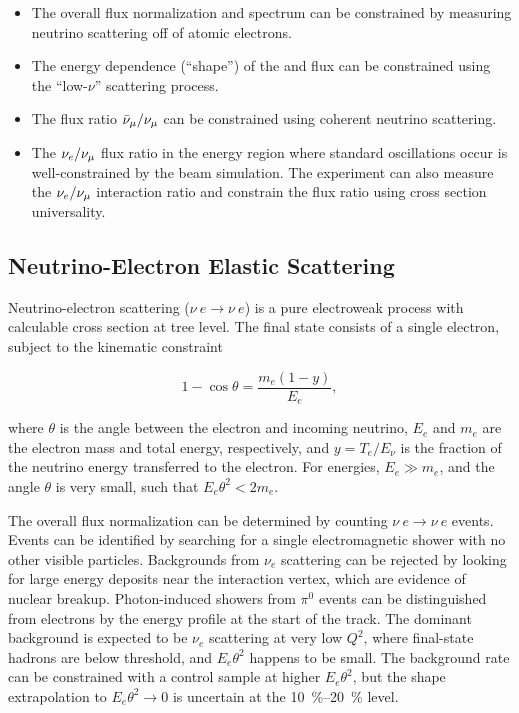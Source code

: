 \begin{itemize}
    \item The overall flux normalization and spectrum can be constrained by measuring neutrino scattering off of atomic electrons.
    \item The energy dependence (``shape'') of the \numu and \anumu %
     flux can be constrained using the ``low-$\nu$'' scattering process.
    \item The flux ratio $\bar\nu_\mu/\nu_\mu$ can be constrained using  coherent neutrino scattering.
    \item The $\nu_e/\nu_\mu$ flux ratio in the energy region where standard oscillations occur is well-constrained by the beam simulation. The experiment can also measure the $\nu_e/\nu_\mu$ interaction ratio and constrain the flux ratio using cross section universality.
\end{itemize}





\subsection{Neutrino-Electron Elastic Scattering}
\label{sec:appx-nd:fluxintro-e-nu-scatt}



Neutrino-electron scattering ($\nu \ e \rightarrow \nu \ e$) is a pure electroweak process with calculable cross section at tree level. The final state consists of a single electron, subject to the kinematic constraint 

\begin{equation}
1 - \cos \theta = \frac{m_{e}(1-y)}{E_{e}},
\end{equation}

where $\theta$ is the angle between the electron and incoming neutrino, $E_{e}$ and $m_{e}$ are the electron mass and total energy, respectively, and $y = T_{e}/E_{\nu}$ is the fraction of the neutrino energy transferred to the electron. For  energies, $E_{e} \gg m_{e}$, and the angle $\theta$ is very small, such that $E_{e}\theta^{2} < 2m_{e}$. 

The overall flux normalization can be determined by counting $\nu \ e \rightarrow \nu \ e$ events. Events can be identified by searching for a single electromagnetic shower with no other visible particles. Backgrounds from $\nu_{e}$  scattering can be rejected by looking for large energy deposits near the interaction vertex, which are evidence of nuclear breakup. Photon-induced showers from  $\pi^{0}$ events can be distinguished from electrons by the energy profile at the start of the track. The dominant background is expected to be $\nu_{e}$  scattering at very low $Q^{2}$, where final-state hadrons are below threshold, and $E_{e}\theta^{2}$ happens to be small. The background rate can be constrained with a control sample at higher $E_{e}\theta^{2}$, but the shape extrapolation to $E_{e}\theta^{2} \rightarrow 0$ is uncertain at the \SIrange{10}{20}{\%} level.

